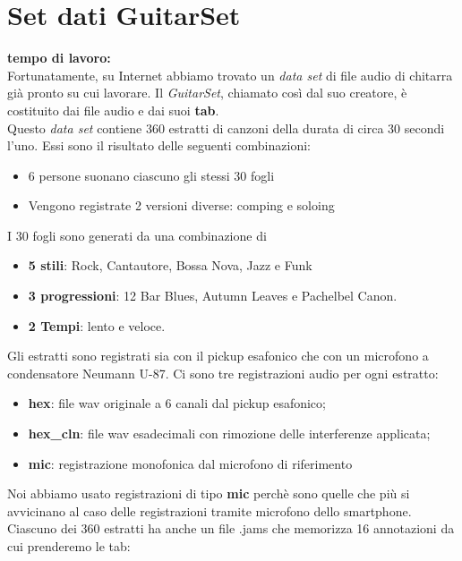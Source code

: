 \section{Set dati GuitarSet}
\textbf{tempo di lavoro:} \\
\newline
Fortunatamente, su Internet abbiamo trovato un \textit{data set} di file audio di chitarra già pronto su cui lavorare. Il \textit{GuitarSet}, chiamato così dal suo creatore, è costituito dai file audio e dai suoi \textbf{tab}.\\
Questo \textit{data set} contiene 360 estratti di canzoni della durata di circa 30 secondi l'uno. Essi sono il risultato delle seguenti combinazioni:
\begin{itemize}
	\item 6 persone suonano ciascuno gli stessi 30 fogli
	\item Vengono registrate 2 versioni diverse: comping e soloing
\end{itemize}
I 30 fogli sono generati da una combinazione di
\begin{itemize}
	\item \textbf{5 stili}: Rock, Cantautore, Bossa Nova, Jazz e Funk
	\item \textbf{3 progressioni}: 12 Bar Blues, Autumn Leaves e Pachelbel Canon.
	\item \textbf{2 Tempi}: lento e veloce.
\end{itemize}
Gli estratti sono registrati sia con il pickup esafonico che con un microfono a condensatore Neumann U-87.
Ci sono tre registrazioni audio per ogni estratto:
\begin{itemize}
	\item \textbf{hex}: file wav originale a 6 canali dal pickup esafonico;
	\item \textbf{hex\_cln}: file wav esadecimali con rimozione delle interferenze applicata;
	\item \textbf{mic}: registrazione monofonica dal microfono di riferimento
\end{itemize}
Noi abbiamo usato registrazioni di tipo \textbf{mic} perchè sono quelle che più si avvicinano al caso delle registrazioni tramite microfono dello smartphone.\\
\newline
Ciascuno dei 360 estratti ha anche un file .jams che memorizza 16 annotazioni da cui prenderemo le tab:
